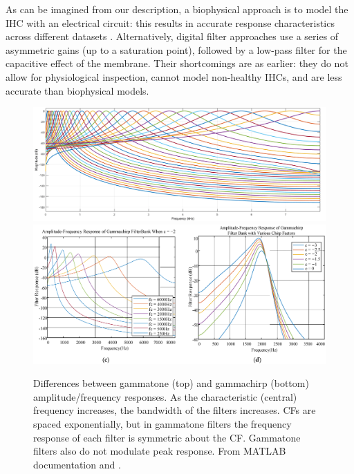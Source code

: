 \documentclass[11pt,a4paper]{article}
\begin{document}
As can be imagined from our description, a biophysical approach is to model the IHC with an electrical circuit: this results in accurate response characteristics across different datasets \cite{lopez-povedaBiophysicalModelInner2006}. Alternatively, digital filter approaches use a series of asymmetric gains (up to a saturation point), followed by a low-pass filter for the capacitive effect of the membrane. Their shortcomings are as earlier: they do not allow for physiological inspection, cannot model non-healthy IHCs, and are less accurate than biophysical models.
\begin{figure}
    \centering
    \includegraphics[width=0.8\linewidth]{Images/gammatone.png}
    \includegraphics[width=0.8\linewidth]{Images/gammachirp-bank.png}
    \caption{Differences between gammatone (top) and gammachirp (bottom) amplitude/frequency responses. As the characteristic (central) frequency increases, the bandwidth of the filters increases. CFs are spaced exponentially, but in gammatone filters the frequency response of each filter is symmetric about the CF. Gammatone filters also do not modulate peak response. From MATLAB documentation \cite{GammatoneFilterBankGammatoneFilter} and \cite{guoDesignMethodGammachirp2022}.}
    \label{fig:coc-gammatone-vs-gammachirp}
\end{figure}
\end{document}
